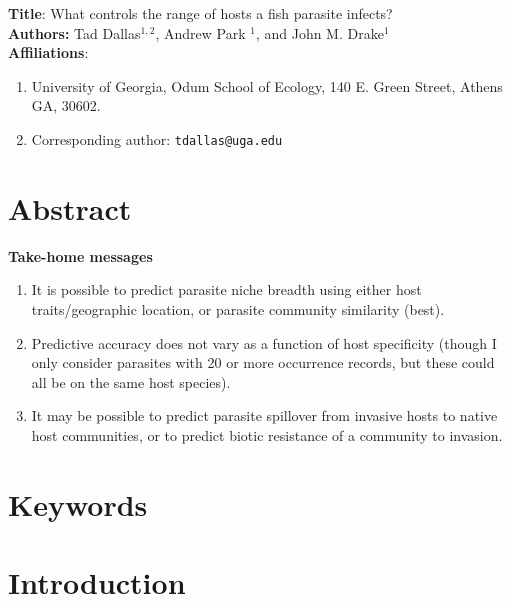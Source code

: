 \documentclass[12pt]{article}
\begin{document}
\setcounter{page}{1}

\textbf{Title}: What controls the range of hosts a fish parasite infects? \\
\vspace{0.5cm}
\textbf{Authors:} Tad Dallas$^{1,2}$, Andrew Park $^{1}$, and John M. Drake$^{1}$ \\
\vspace{0.5cm}
\textbf{Affiliations}: 
\begin{enumerate}
  \item University of Georgia, Odum School of Ecology, 140 E. Green Street, Athens GA, 30602. 
  \item Corresponding author: \texttt{tdallas@uga.edu}
\end{enumerate}


\linenumbers
\doublespacing


\section{Abstract}

\textbf{Take-home messages} \\
\begin{enumerate}
 \item It is possible to predict parasite niche breadth using either host traits/geographic location, or parasite community similarity (best). 
 \item Predictive accuracy does not vary as a function of host specificity (though I only consider parasites with 20 or more occurrence records, but these could all be on the same host species).
 \item It may be possible to predict parasite spillover from invasive hosts to native host communities, or to predict biotic resistance of a community to invasion. 
 
\end{enumerate}



\section{Keywords}



\section{Introduction}
 
\end{document}
